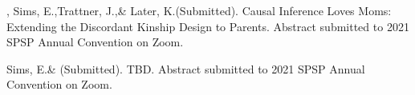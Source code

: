 \item \meb, Sims, E.,\notb Trattner, J.,\nota \& Later, K.\notans (Submitted). Causal Inference Loves Moms: Extending the Discordant Kinship Design to Parents. Abstract submitted to 2021 SPSP Annual Convention on Zoom.
%
\item Sims, E.\notbns \& \meb (Submitted). TBD. Abstract submitted to 2021 SPSP Annual Convention on Zoom.